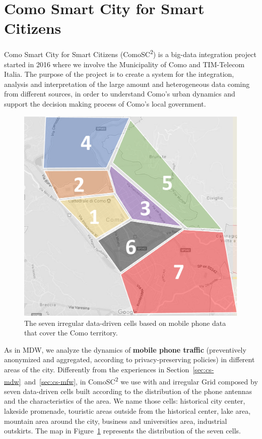 \section{Como Smart City for Smart Citizens} \label{sec:cs-como}
Como Smart City for Smart Citizens (ComoSC\textsuperscript{2}) is a big-data integration project started in 2016 where we involve the Municipality of Como and TIM-Telecom Italia. The purpose of the project is to create a system for the integration, analysis and interpretation of the large amount and heterogeneous data coming from different sources, in order to understand Como's urban dynamics and support  the decision making process of Como's local government.

\begin{figure}[t]
  \centering
  \includegraphics[width=.6\linewidth]{img/como-district}
  \caption{The seven irregular data-driven cells based on mobile phone data that cover the Como territory.}
  \label{fig:map1}
\end{figure}

As in MDW, we analyze the dynamics of \textbf{mobile phone traffic} (preventively anonymized and aggregated, according to privacy-preserving policies) in different areas of the city. 
Differently from the experiences in Section~\ref{sec:cs-mdw}~and~\ref{sec:cs-mfw}, in ComoSC\textsuperscript{2} we use \frappe{} with and irregular \textsf{Grid} composed by seven data-driven \textsf{cell}s built according to the distribution of the phone antennas and the characteristics of the area. 
We name those cells: historical city  center, lakeside promenade, touristic areas outside from the historical center, lake area, mountain area around the city, business and universities area, industrial outskirts.
The map in Figure~\ref{fig:map1} represents the distribution of the seven cells.

